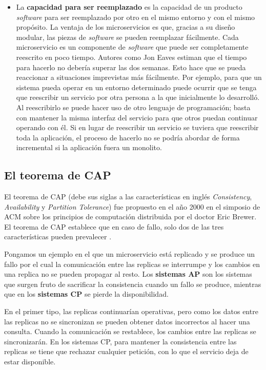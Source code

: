 \documentclass[11pt,spanish,listoffigures]{tfgetsinf}
\begin{document}
\begin{itemize}
\item La \textbf{capacidad para ser reemplazado} es la capacidad de un producto \textit{software} para ser reemplazado por otro en el mismo entorno y con el mismo propósito. La ventaja de los microservicios es que, gracias a su diseño modular, las piezas de \textit{software} se pueden reemplazar fácilmente. Cada microservicio es un componente de \textit{software} que puede ser completamente reescrito en poco tiempo. Autores como Jon Eaves \cite{Eaves2014} estiman que el tiempo para hacerlo no debería superar las dos semanas. Esto hace que se pueda reaccionar a situaciones imprevistas más fácilmente. Por ejemplo, para que un sistema pueda operar en un entorno determinado puede ocurrir que se tenga que reescribir un servicio por otra persona a la que inicialmente lo desarrolló. Al reescribirlo se puede hacer uso de otro lenguaje de programación; basta con mantener la misma interfaz del servicio para que otros puedan continuar operando con él. Si en lugar de reescribir un servicio se tuviera que reescribir toda la aplicación, el proceso de hacerlo no se podría abordar de forma incremental si la aplicación fuera un monolito.

\end{itemize}

\subsection{El teorema de CAP}

El teorema de CAP \cite{Brewer2000} (debe sus siglas a las características en inglés \textit{Consistency}, \textit{Availability} y \textit{Partition Tolerance}) fue propuesto en el año 2000 en el simposio de ACM sobre los principios de computación distribuida por el doctor Eric Brewer. El teorema de CAP establece que en caso de fallo, solo dos de las tres características pueden prevalecer \cite{Gilbert2012}.

Pongamos un ejemplo en el que un microservicio está replicado y se produce un fallo por el cual la comunicación entre las replicas se interrumpe y los cambios en una replica no se pueden propagar al resto. Los \textbf{sistemas AP} son los sistemas que surgen fruto de sacrificar la consistencia cuando un fallo se produce, mientras que en los \textbf{sistemas CP} se pierde la disponibilidad. 

En el primer tipo, las replicas continuarían operativas, pero como los datos entre las replicas no se sincronizan se pueden obtener datos incorrectos al hacer una consulta. Cuando la comunicación se restablece, los cambios entre las replicas se sincronizarán. En los sistemas CP, para mantener la consistencia entre las replicas se tiene que rechazar cualquier petición, con lo que el servicio deja de estar disponible.
\end{document}
